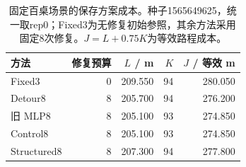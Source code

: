 \begin{table}[htbp]
\centering
\caption{固定百桌场景的保存方案成本。种子1565649625，统一取rep0；Fixed3为无修复初始参照，其余方法采用固定8次修复。$J=L+0.75K$为等效路程成本。}
\label{tab:fixed-main100-costs}
\begin{tabular}{lrrrr}
\toprule
方法 & 修复预算 & $L$ / m & $K$ & $J$ / 等效 m \\
\midrule
Fixed3 & 0 & 209.550 & 94 & 280.050 \\
Detour8 & 8 & 205.700 & 94 & 276.200 \\
旧 MLP8 & 8 & 205.100 & 93 & 274.850 \\
Control8 & 8 & 205.100 & 93 & 274.850 \\
Structured8 & 8 & 207.300 & 94 & 277.800 \\
\bottomrule
\end{tabular}
\end{table}
